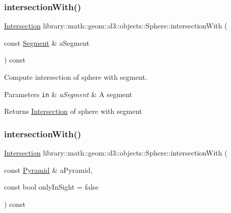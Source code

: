 \subsubsection{\texorpdfstring{intersection\+With()}{intersectionWith()}\hspace{0.1cm}{\footnotesize\ttfamily [3/5]}}
{\footnotesize\ttfamily \hyperlink{classlibrary_1_1math_1_1geom_1_1d3_1_1_intersection}{Intersection} library\+::math\+::geom\+::d3\+::objects\+::\+Sphere\+::intersection\+With (\begin{DoxyParamCaption}\item[{const \hyperlink{classlibrary_1_1math_1_1geom_1_1d3_1_1objects_1_1_segment}{Segment} \&}]{a\+Segment }\end{DoxyParamCaption}) const}



Compute intersection of sphere with segment. 


\begin{DoxyParams}[1]{Parameters}
\mbox{\tt in}  & {\em a\+Segment} & A segment \\
\hline
\end{DoxyParams}
\begin{DoxyReturn}{Returns}
\hyperlink{classlibrary_1_1math_1_1geom_1_1d3_1_1_intersection}{Intersection} of sphere with segment 
\end{DoxyReturn}
\mbox{\label{classlibrary_1_1math_1_1geom_1_1d3_1_1objects_1_1_sphere_ac7a5e8323eca47f121a457b99fbf6627}} 
\subsubsection{\texorpdfstring{intersection\+With()}{intersectionWith()}\hspace{0.1cm}{\footnotesize\ttfamily [4/5]}}
{\footnotesize\ttfamily \hyperlink{classlibrary_1_1math_1_1geom_1_1d3_1_1_intersection}{Intersection} library\+::math\+::geom\+::d3\+::objects\+::\+Sphere\+::intersection\+With (\begin{DoxyParamCaption}\item[{const \hyperlink{classlibrary_1_1math_1_1geom_1_1d3_1_1objects_1_1_pyramid}{Pyramid} \&}]{a\+Pyramid,  }\item[{const bool}]{only\+In\+Sight = {\ttfamily false} }\end{DoxyParamCaption}) const}



